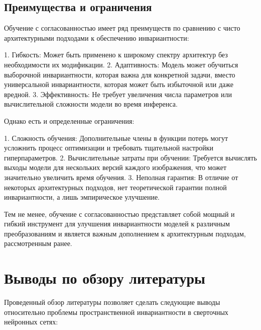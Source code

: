 \subsection{Преимущества и ограничения}
\label{review:consistency:advantages}

Обучение с согласованностью имеет ряд преимуществ по сравнению с чисто архитектурными подходами к обеспечению инвариантности:

1. Гибкость: Может быть применено к широкому спектру архитектур без необходимости их модификации.
2. Адаптивность: Модель может обучиться выборочной инвариантности, которая важна для конкретной задачи, вместо универсальной инвариантности, которая может быть избыточной или даже вредной.
3. Эффективность: Не требует увеличения числа параметров или вычислительной сложности модели во время инференса.

Однако есть и определенные ограничения:

1. Сложность обучения: Дополнительные члены в функции потерь могут усложнить процесс оптимизации и требовать тщательной настройки гиперпараметров.
2. Вычислительные затраты при обучении: Требуется вычислять выходы модели для нескольких версий каждого изображения, что может значительно увеличить время обучения.
3. Неполная гарантия: В отличие от некоторых архитектурных подходов, нет теоретической гарантии полной инвариантности, а лишь эмпирическое улучшение.

Тем не менее, обучение с согласованностью представляет собой мощный и гибкий инструмент для улучшения инвариантности моделей к различным преобразованиям и является важным дополнением к архитектурным подходам, рассмотренным ранее.

\section{Выводы по обзору литературы}
\label{review:conclusions}

Проведенный обзор литературы позволяет сделать следующие выводы относительно проблемы пространственной инвариантности в сверточных нейронных сетях:

